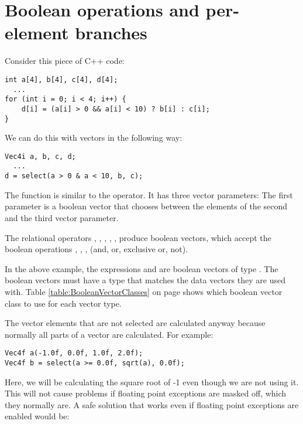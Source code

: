\documentclass[vcl_manual.tex]{subfiles}
\begin{document}
\flushleft

\chapter{Boolean operations and per-element branches}\label{chap:BooleanOperations}
Consider this piece of C++ code:

\begin{lstlisting}[frame=none]
int a[4], b[4], c[4], d[4];
  ...
for (int i = 0; i < 4; i++) {
    d[i] = (a[i] > 0 && a[i] < 10) ? b[i] : c[i];
}
\end{lstlisting}

We can do this with vectors in the following way:

\begin{lstlisting}[frame=none]
Vec4i a, b, c, d;
  ...
d = select(a > 0 & a < 10, b, c);
\end{lstlisting}

The  function is similar to the   operator. 
It has three vector parameters: The first parameter is a boolean vector that chooses between the elements of the second and the third vector parameter. 

The relational operators \codei{\textgreater}, \codei{\textgreater=}, \codei{\textless}, \codei{\textless=}, \codei{==}, \codei{!=} produce boolean vectors, 
which accept the boolean operations \codei{\&}, 
\codei{|}, \codei{$\wedge$}, \codei{$\sim$} (and, or, exclusive or, not). 

In the above example, the expressions  and  are boolean vectors of type . The boolean vectors must have a type that matches the data vectors they are used with. Table \ref{table:BooleanVectorClasses} on page \pageref{table:BooleanVectorClasses} shows which boolean vector class to use for each vector type.

The vector elements that are not selected are calculated anyway because normally all parts of a vector are calculated. For example:

\begin{lstlisting}[frame=none]
Vec4f a(-1.0f, 0.0f, 1.0f, 2.0f);
Vec4f b = select(a >= 0.0f, sqrt(a), 0.0f);
\end{lstlisting}

Here, we will be calculating the square root of -1 even though we are not using it. This will not cause problems if floating point exceptions are masked off, which they normally are. A safe solution that works even if floating point exceptions are enabled would be:
\end{document}
